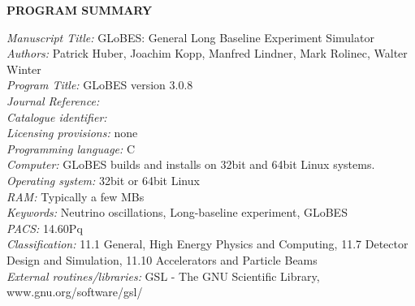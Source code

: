 \documentclass{elsart}
\newcounter{bla}
\begin{document}

{\bf PROGRAM SUMMARY}

\begin{small}
\noindent
{\em Manuscript Title:} GLoBES: General Long Baseline Experiment Simulator\\
{\em Authors:} Patrick Huber, Joachim Kopp, Manfred Lindner, Mark Rolinec, Walter Winter\\
{\em Program Title:} GLoBES version 3.0.8\\
{\em Journal Reference:}                                      \\
{\em Catalogue identifier:}                                   \\
{\em Licensing provisions:} none                                  \\
{\em Programming language:} C                                  \\
{\em Computer:} GLoBES builds and installs on 32bit and 64bit Linux systems.\\
{\em Operating system:} 32bit or 64bit Linux                                      \\
{\em RAM:} Typically a few MBs                                         \\
{\em Keywords:} Neutrino oscillations, Long-baseline experiment,
GLoBES \\
{\em PACS:} 14.60Pq    \\
{\em Classification:} 11.1  General, High Energy Physics and Computing, 
  11.7 Detector Design and Simulation, 11.10 Accelerators and Particle Beams    \\
{\em External routines/libraries:} GSL - The GNU Scientific Library,
www.gnu.org/software/gsl/\\


\end{small}
\end{document}
